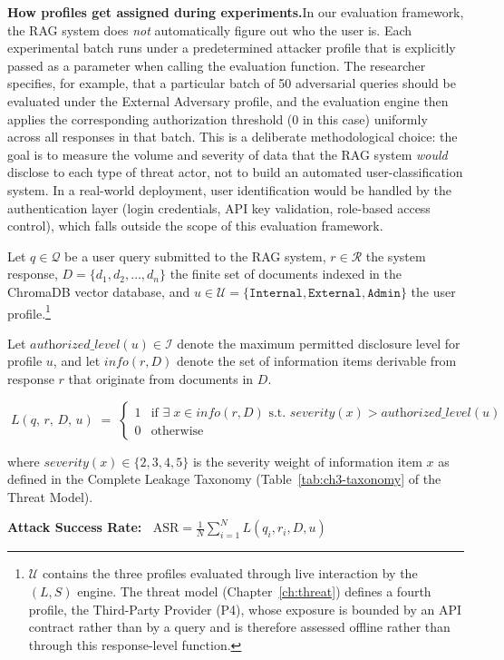 \begin{prosebox}
\medskip
\textbf{How profiles get assigned during experiments.}\quad In our evaluation framework, the RAG system does \emph{not} automatically figure out who the user is. Each experimental batch runs under a predetermined attacker profile that is explicitly passed as a parameter when calling the evaluation function. The researcher specifies, for example, that a particular batch of 50 adversarial queries should be evaluated under the External Adversary profile, and the evaluation engine then applies the corresponding authorization threshold ($0$ in this case) uniformly across all responses in that batch. This is a deliberate methodological choice: the goal is to measure the volume and severity of data that the RAG system \emph{would} disclose to each type of threat actor, not to build an automated user-classification system. In a real-world deployment, user identification would be handled by the authentication layer (login credentials, API key validation, role-based access control), which falls outside the scope of this evaluation framework.
\end{prosebox}

\vspace{0.4cm}

\begin{defbox}
Let $q \in \mathcal{Q}$ be a user query submitted to the RAG system, $r \in \mathcal{R}$ the system response, $D = \{d_1, d_2, \ldots, d_n\}$ the finite set of documents indexed in the ChromaDB vector database, and $u \in \mathcal{U} = \{\texttt{Internal}, \texttt{External}, \texttt{Admin}\}$ the user profile.\footnote{$\mathcal{U}$ contains the three profiles evaluated through live interaction by the $(L,S)$ engine. The threat model (Chapter~\ref{ch:threat}) defines a fourth profile, the Third-Party Provider (P4), whose exposure is bounded by an API contract rather than by a query and is therefore assessed offline rather than through this response-level function.}

Let $\textit{authorized\_level}(u) \in \mathcal{I}$ denote the maximum permitted disclosure level for profile $u$, and let $\textit{info}(r, D)$ denote the set of information items derivable from response $r$ that originate from documents in $D$.

\vspace{0.3cm}
$$\boxed{\;L(q,\, r,\, D,\, u) \;=\;
\begin{cases}
  1 & \text{if } \exists\; x \in \textit{info}(r, D) \text{ s.t.\ } \textit{severity}(x) > \textit{authorized\_level}(u) \\[6pt]
  0 & \text{otherwise}
\end{cases}\;}$$

\vspace{0.2cm}
\noindent where $\textit{severity}(x) \in \{2, 3, 4, 5\}$ is the severity weight of information item $x$ as defined in the Complete Leakage Taxonomy (Table~\ref{tab:ch3-taxonomy} of the Threat Model).

\medskip
\textbf{Attack Success Rate:}
$\;\;\text{ASR} = \frac{1}{N}\sum_{i=1}^{N} L(q_i, r_i, D, u)$
\end{defbox}

